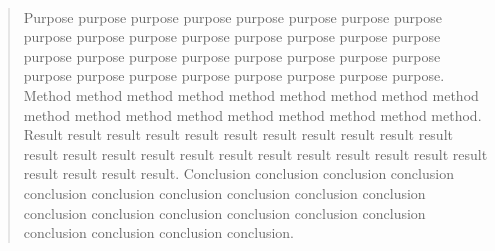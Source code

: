 \ifShowEnAbstract %
\begin{center} %
    \vspace{1em} %
    {\bf {} \ReportNameEn \par\vspace*{10pt}} %
    { \StudentNameEn}\\ %
    { \StudentAffiliationEn} %
\end{center} %
\renewcommand{\abstractname}{\zihao{5} \bf Abstract} %
\begin{abstract} %
    Purpose purpose purpose purpose purpose purpose purpose purpose purpose purpose purpose purpose purpose purpose purpose purpose purpose purpose purpose purpose purpose purpose purpose purpose purpose purpose purpose purpose purpose purpose purpose purpose. Method method method method method method method method method method method method method method method method method method. Result result result result result result result result result result result result result result result result result result result result result result result result result result result. Conclusion conclusion conclusion conclusion conclusion conclusion conclusion conclusion conclusion conclusion conclusion conclusion conclusion conclusion conclusion conclusion conclusion conclusion conclusion conclusion. %
    \par {} %
\end{abstract} %
\fi %